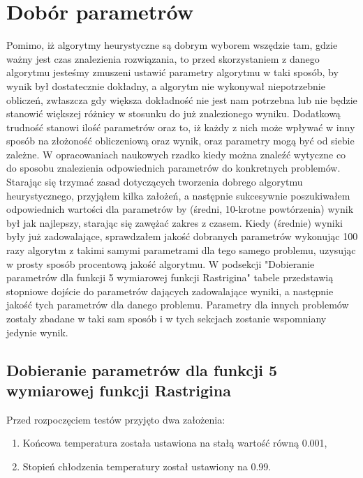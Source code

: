 \documentclass[twoside]{projektInzynierskiMS1}
\newcommand{\si}{ś}
\begin{document}
\section{Dobór parametrów}
Pomimo, iż algorytmy heurystyczne są dobrym wyborem wszędzie tam, gdzie ważny jest czas znalezienia rozwiązania, to przed skorzystaniem z danego algorytmu jeste\si my zmuszeni ustawić parametry algorytmu w taki sposób, by wynik był dostatecznie dokładny, a algorytm nie wykonywał niepotrzebnie obliczeń, zwłaszcza gdy większa dokładno\si ć nie jest nam potrzebna lub nie będzie stanowić większej różnicy w stosunku do już znalezionego wyniku. Dodatkową trudno\si ć stanowi ilo\si ć parametrów oraz to, iż każdy z nich może wpływać w inny sposób na złożono\si ć obliczeniową oraz wynik, oraz parametry mogą być od siebie zależne. W opracowaniach naukowych rzadko kiedy można znaleźć wytyczne co do sposobu znalezienia odpowiednich parametrów do konkretnych problemów. \\

Starając się trzymać zasad dotyczących tworzenia dobrego algorytmu heurystycznego, przyjąłem kilka założeń, a następnie sukcesywnie poszukiwałem odpowiednich warto\si ci dla parametrów by (\si redni, 10-krotne powtórzenia) wynik był jak najlepszy, starając się zawężać zakres z czasem. Kiedy (\si rednie) wyniki były już zadowalające, sprawdzałem jako\si ć dobranych parametrów wykonując 100 razy algorytm z takimi samymi parametrami dla tego samego problemu, uzysując w prosty sposób procentową jako\si ć algorytmu. W podsekcji "Dobieranie parametrów dla funkcji 5 wymiarowej funkcji Rastrigina" tabele przedstawią stopniowe doj\si cie do parametrów dających zadowalające wyniki, a następnie jako\si ć tych parametrów dla danego problemu. Parametry dla innych problemów zostały zbadane w taki sam sposób i w tych sekcjach zostanie wspomniany jedynie wynik.

	\subsection{Dobieranie parametrów dla funkcji 5 wymiarowej funkcji Rastrigina}

Przed rozpoczęciem testów przyjęto dwa założenia:
\begin{enumerate}
	\item Końcowa temperatura została ustawiona na stałą warto\si ć równą 0.001,
	\item Stopień chłodzenia temperatury został ustawiony na 0.99.
\end{enumerate}
\end{document}
